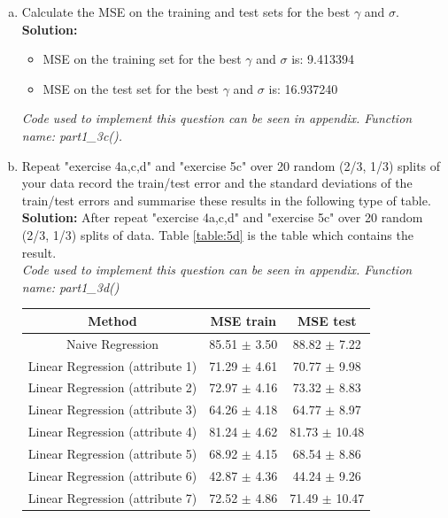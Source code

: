 \documentclass[A4,12pt]{article}
\begin{document}
\begin{enumerate}[5.]
\begin{enumerate}[a.]
    \item Calculate the MSE on the training and test sets for the best $\gamma$ and $\sigma$.\\
    \textbf{Solution:} 
    \begin{itemize}
      \item MSE on the training set for the best $\gamma$ and $\sigma$ is: 9.413394
      \item MSE on the test set for the best $\gamma$ and $\sigma$ is: 16.937240
    \end{itemize}
    \textit{Code used to implement this question can be seen in appendix. Function name: part1\_3c().}

    \item Repeat "exercise 4a,c,d" and "exercise 5c" over 20 random (2/3, 1/3) splits of your data record the train/test error and the standard deviations of the train/test errors and summarise these results in the following type of table.\\
    \textbf{Solution:} After repeat "exercise 4a,c,d" and "exercise 5c" over 20 random (2/3, 1/3) splits of data. Table \ref{table:5d} is the table which contains the result.\\
    \textit{Code used to implement this question can be seen in appendix. Function name: part1\_3d()}
    \begin{center}
      \begin{table}
        \centering
        \begin{tabular}{ccc}  
          \hline                      
            \textbf{Method} & \textbf{MSE train}  & \textbf{MSE test}  \\
          \hline
            Naive Regression&85.51 $\pm$ 3.50 & 88.82 $\pm$ 7.22\\
            Linear Regression (attribute 1)  & 71.29 $\pm$ 4.61 & 70.77 $\pm$ 9.98 \\
            Linear Regression (attribute 2)  & 72.97 $\pm$ 4.16 & 73.32 $\pm$ 8.83 \\
            Linear Regression (attribute 3)  & 64.26 $\pm$ 4.18 & 64.77 $\pm$ 8.97 \\
            Linear Regression (attribute 4)  & 81.24 $\pm$ 4.62 & 81.73 $\pm$ 10.48 \\
            Linear Regression (attribute 5)  & 68.92 $\pm$ 4.15 & 68.54 $\pm$ 8.86 \\
            Linear Regression (attribute 6)  & 42.87 $\pm$ 4.36 & 44.24 $\pm$ 9.26 \\
            Linear Regression (attribute 7)  & 72.52 $\pm$ 4.86 & 71.49 $\pm$ 10.47 \\

\end{tabular}
\end{table}
\end{center}
\end{enumerate}
\end{enumerate}
\end{document}
